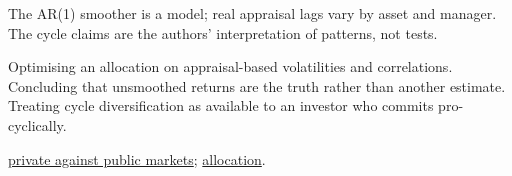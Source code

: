 \begin{qfmethod}
 The AR(1) smoother is a model; real appraisal lags vary by asset and manager. The cycle claims are the authors' interpretation of patterns, not tests.

 Optimising an allocation on appraisal-based volatilities and correlations. Concluding that unsmoothed returns are the truth rather than another estimate. Treating cycle diversification as available to an investor who commits pro-cyclically.

 \hyperref[meth:private-public-market-comparison]{private against public markets}; \hyperref[meth:alternatives-allocation-approaches]{allocation}.

\end{qfmethod}
